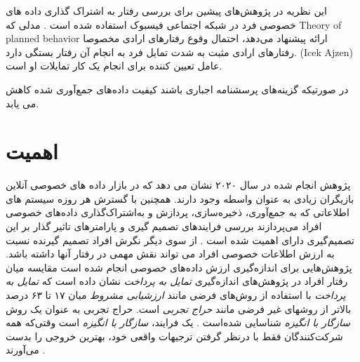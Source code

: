   این نظریه در پژوهش‌های پیشین برای بررسی رفتار
  به اشتراک گذاری داده های خصوصی
  فرد در شبکه اجتماعی فیسبوک استفاده شده است
  \!\cite{vanderschyffInformationPrivacyBehavior2020}
  \!.
  مدلی که
  \!\gls{Theory of planned behavior}
  ارائه پیشنهاد می‌دهد، احتمال وقوع  رفتار‌های ارادی مخصوصا رفتار‌های ارادی مثبت به شدت تمایل فرد به
  انجام آن رفتار بستگی دارد.
  \!({\gls{Icek Ajzen}})
  عامل تعیین کننده برای انجام یک کار تمایلات او است.
\fi

\ifSurveyfillingBehavior
  در صورتیکه گزینه‌های پرسشنامه اجباری باشند کیفیت داده‌های جمع‌آوری شده کاهش می یابد.
  \!\cite{sischkaImpactForcedAnswering2022}
\fi
\section{اهمیت}
پژوهش انجام شده در سال ۲۰۲۰ نشان می دهد که در بازار داده های خصوصی آنلاین بازیگران زیادی به عنوان واسطه وجود دارند.
\!\cite{agogoInvisibleMarketOnline2021}
همچنین با گسترش هر روزه سیستم های اطلاعاتی که به
جمع‌آوری، ذخیره‌سازی، پردازش و به‌اشتراک‌گذاری داده‌های
خصوصی افراد می‌پردازند بررسی فرایندهای
تصمیم گیری و پارامتر‌های تاثیر گذار
بر این تصمیم‌گیری دارای اهمیت شده است
\!.
\!\cite{spiekermannValuesEthicsInformation2022}
از سوی دیگر نگرش افراد تصمیم گیرنده نسبت به ارزش اطلاعات خصوصی افراد می تواند نقش مهمی در رفتار آنها داشته باشد.
پژوهش‌هایی برای اندازه‌گیری ارزش داده‌های خصوصی انجام شده است
\!\cite{  fastValuePersonalData2021a,wesselsSellNotSell2019,tangHowChineseWeb2021}
\ifWillingnessToPay
  مقایسه میان رفتار افراد در پژوهش‌های اندازه‌گیری
  \textit{تمایل به پرداخت}
  نشان داده است که
  \textit{تمایل به پرداخت }
  با استفاده از روش‌های فرضی مانند
  \textit{ارزشيابی مشروط}
  میان ۱۷ تا ۶۳ درصد بالاتر
  از روشهای غیر فرضی مانند
  \textit{حراج تجربی}
  است.
  حراج تجربی به عنوان یک روش
  \textit{سازگار با انگیزه}
  شناسایی شده‌است
  \!\citep{martinez-carrascoComparingHypotheticalNonhypothetical2015}
  .
  یک فرایند،
  \textit{سازگار با انگیزه}
  است وقتی‌که همه شرکت‌کنندگان فقط  با درنظر گرفتن ترجیهات واقعی خود، بهترین خروجی را بدست می‌آورند
  \!\citep{nisanAlgorithmicGameTheory2007}
  \!.


